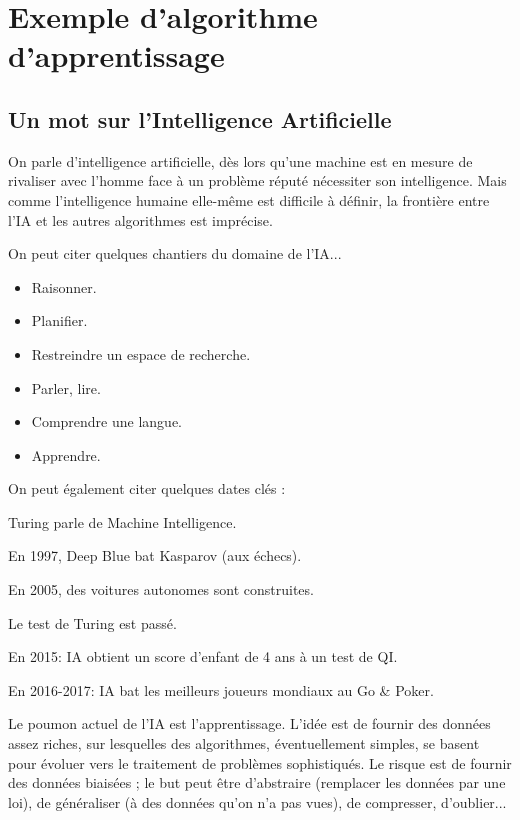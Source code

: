 \chapter{Exemple d'algorithme d'apprentissage}

\section{Un mot sur l'Intelligence Artificielle}

On parle d'intelligence artificielle, dès lors qu'une machine est en mesure de rivaliser avec l'homme face à un problème réputé nécessiter son intelligence. Mais comme l'intelligence humaine elle-même est difficile à définir, la frontière entre l'IA et les autres algorithmes est imprécise.

On peut citer quelques chantiers du domaine de l'IA...

\begin{multicols}{2}
\begin{itemize}
	\item Raisonner.
	\item Planifier.
	\item Restreindre un espace de recherche.
	\item Parler, lire.
	\item Comprendre une langue.
	\item Apprendre.
\end{itemize}
\end{multicols}

On peut également citer quelques dates clés :

\date{1948} Turing parle de Machine Intelligence.

En 1997, Deep Blue bat Kasparov (aux échecs).

En 2005, des voitures autonomes sont construites.

\date{2014} Le test de Turing est passé.

En 2015: IA obtient un score d'enfant de 4 ans à un test de QI.

En 2016-2017: IA bat les meilleurs joueurs mondiaux au Go \& Poker.

\medskip

Le poumon actuel de l'IA est l'apprentissage. L'idée est de fournir des données assez riches, sur lesquelles des algorithmes, éventuellement simples, se basent pour évoluer vers le traitement de problèmes sophistiqués. Le risque est de fournir des données biaisées ; le but peut être d'abstraire (remplacer les données par une loi), de généraliser (à des données qu'on n'a pas vues), de compresser, d'oublier...

